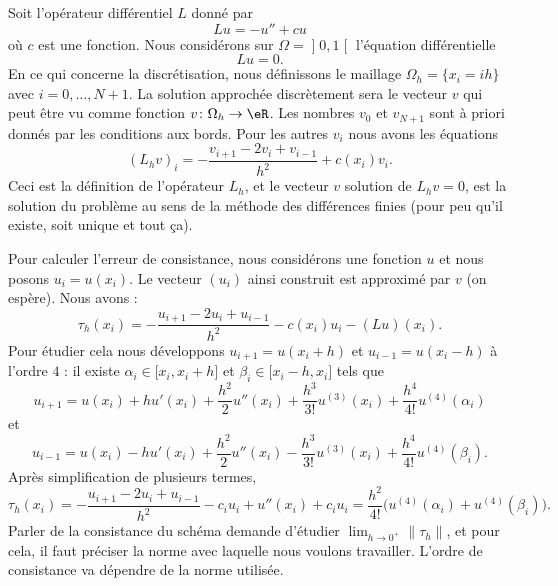 Soit l'opérateur différentiel \( L\) donné par
\begin{equation}
	Lu=-u''+cu
\end{equation}
où \( c\) est une fonction. Nous considérons sur \( \Omega=\mathopen] 0 , 1 \mathclose[\) l'équation différentielle
\begin{equation}
	Lu=0.
\end{equation}
En ce qui concerne la discrétisation, nous définissons le maillage \( \Omega_h=\{x_i=ih\}\) avec \( i=0,\ldots, N+1\). La solution approchée discrètement sera le vecteur \( v\) qui peut être vu comme fonction \( v\colon \Omega_h\to \eR\). Les nombres \( v_0\) et \( v_{N+1}\) sont à priori donnés par les conditions aux bords. Pour les autres \( v_i\) nous avons les équations
\begin{equation}
	(L_hv)_i=-\frac{ v_{i+1}-2v_i+v_{i-1} }{ h^2 }+c(x_i)v_i.
\end{equation}
Ceci est la définition de l'opérateur \( L_h\), et le vecteur \( v\) solution de \( L_hv=0\), est la solution du problème au sens de la méthode des différences finies (pour peu qu'il existe, soit unique et tout ça).

Pour calculer l'erreur de consistance, nous considérons une fonction \( u\) et nous posons \( u_i=u(x_i)\). Le vecteur \( (u_i)\) ainsi construit est approximé par \( v\) (on espère). Nous avons :
\begin{equation}
	\tau_h(x_i)=-\frac{ u_{i+1}-2u_i+u_{i-1} }{ h^2 }-c(x_i)u_i-(Lu)(x_i).
\end{equation}
Pour étudier cela nous développons \( u_{i+1}=u(x_i+h)\) et \( u_{i-1}=u(x_i-h)\) à l'ordre \( 4\) : il existe \( \alpha_i\in\mathopen[ x_i , x_i+h \mathclose]\) et \( \beta_i\in\mathopen[ x_i-h , x_i \mathclose]\) tels que
\begin{equation}
	u_{i+1}=u(x_i)+hu'(x_i)+\frac{ h^2 }{2}u''(x_i)+\frac{ h^3 }{ 3! }u^{(3)}(x_i)+\frac{ h^4 }{ 4! }u^{(4)}(\alpha_i)
\end{equation}
et
\begin{equation}
	u_{i-1}=u(x_i)-hu'(x_i)+\frac{ h^2 }{2}u''(x_i)-\frac{ h^3 }{ 3! }u^{(3)}(x_i)+\frac{ h^4 }{ 4! }u^{(4)}(\beta_i).
\end{equation}
Après simplification de plusieurs termes,
\begin{equation}
	\tau_h(x_i)=-\frac{ u_{i+1}-2u_i+u_{i-1} }{ h^2 }-c_iu_i+u''(x_i)+c_iu_i=\frac{ h^2 }{ 4! }\big( u^{(4)}(\alpha_i)+u^{(4)}(\beta_i) \big).
\end{equation}
Parler de la consistance du schéma demande d'étudier \( \lim_{h\to 0^+}\| \tau_h \| \), et pour cela, il faut préciser la norme avec laquelle nous voulons travailler. L'ordre de consistance va dépendre de la norme utilisée.


